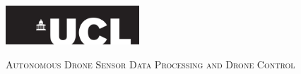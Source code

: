 \begin{titlepage}

  \newcommand{\HRule}{\rule{\linewidth}{0.5mm}} %

  \center
  \includegraphics[width=5cm]{Title/UCL.png}\\[1.5cm] %


  \center %


  { \Huge \textsc{Autonomous Drone Sensor Data Processing and Drone Control}}\\[1.5cm] %




\end{titlepage}
